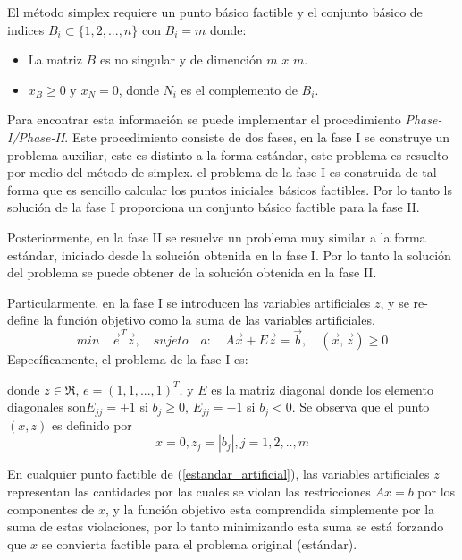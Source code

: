 El método simplex requiere un punto básico factible y el conjunto básico de indices $B_i \subset \{ 1, 2, ..., n\} $ con $B_i = m$ donde:
\begin{itemize}
   \item La matriz $B$ es no singular y de dimención $m$ $x$ $m$.
   \item $x_B \geq 0$ y $x_N=0$, donde $N_i$ es el complemento de $B_i$.
\end{itemize}

Para encontrar esta información se puede implementar el procedimiento \textit{Phase-I/Phase-II}.
%
Este procedimiento consiste de dos fases, en la fase I se construye un problema auxiliar, este es distinto a la forma estándar, este problema es resuelto por medio del método de simplex.
%
el problema de la fase I es construida de tal forma que es sencillo calcular los  puntos iniciales básicos factibles.
%
Por lo tanto ls solución de la fase I proporciona un conjunto básico factible para la fase II.
%

Posteriormente, en la fase II se resuelve un problema muy similar a la forma estándar, iniciado desde la solución obtenida en la fase I.
%
Por lo tanto la solución del problema se puede obtener de la solución obtenida en la fase II.
%

Particularmente, en la fase I se introducen las variables artificiales $z$, y se re-define la función objetivo como la suma de las variables artificiales.
%
\begin{equation}\label{estandar_artificial}
min \quad \vec{e}^T \vec{z}, \quad sujeto \quad a: \quad A\vec{x} + E \vec{z} = \vec{b}, \quad (\vec{x},\vec{z}) \geq 0
\end{equation}
%
Específicamente, el problema de la fase I es:

donde $z \in \Re$, $e=(1,1,...,1)^T$, y $E$ es la matriz diagonal donde los elemento diagonales son$E_{jj} = +1$ si $b_j \geq 0$, $E_{jj} = -1$ si $b_j < 0$.
%
Se observa que el punto $(x,z)$ es definido por 
\begin{equation}\label{punto_inicial}
x=0, z_j = |b_j|, j=1,2,..,m
\end{equation}

En cualquier punto factible de (\ref{estandar_artificial}), las variables artificiales $z$ representan las cantidades por las cuales se violan las restricciones $Ax = b$ por los componentes de $x$, y la función objetivo esta comprendida simplemente por la suma de estas violaciones, por lo tanto minimizando esta suma se está forzando que $x$ se convierta factible para el problema original (estándar).
%

